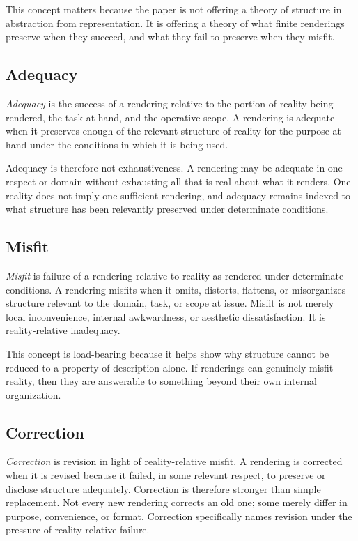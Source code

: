 \documentclass[11pt]{article}
\renewcommand{\emph}[1]{\textit{#1}}
\begin{document}
This concept matters because the paper is not offering a theory of structure in abstraction from representation. It is offering a theory of what finite renderings preserve when they succeed, and what they fail to preserve when they misfit.

\subsection{Adequacy}

\emph{Adequacy} is the success of a rendering relative to the portion of reality being rendered, the task at hand, and the operative scope. A rendering is adequate when it preserves enough of the relevant structure of reality for the purpose at hand under the conditions in which it is being used. \cite{Giere2006ScientificPerspectivism,Massimi2022PerspectivalRealism}

Adequacy is therefore not exhaustiveness. A rendering may be adequate in one respect or domain without exhausting all that is real about what it renders. One reality does not imply one sufficient rendering, and adequacy remains indexed to what structure has been relevantly preserved under determinate conditions.

\subsection{Misfit}

\emph{Misfit} is failure of a rendering relative to reality as rendered under determinate conditions. A rendering misfits when it omits, distorts, flattens, or misorganizes structure relevant to the domain, task, or scope at issue. Misfit is not merely local inconvenience, internal awkwardness, or aesthetic dissatisfaction. It is reality-relative inadequacy.

This concept is load-bearing because it helps show why structure cannot be reduced to a property of description alone. If renderings can genuinely misfit reality, then they are answerable to something beyond their own internal organization.

\subsection{Correction}

\emph{Correction} is revision in light of reality-relative misfit. A rendering is corrected when it is revised because it failed, in some relevant respect, to preserve or disclose structure adequately. Correction is therefore stronger than simple replacement. Not every new rendering corrects an old one; some merely differ in purpose, convenience, or format. Correction specifically names revision under the pressure of reality-relative failure.
\end{document}
